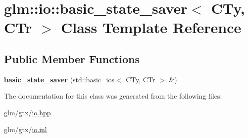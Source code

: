 \hypertarget{classglm_1_1io_1_1basic__state__saver}{\section{glm\-:\-:io\-:\-:basic\-\_\-state\-\_\-saver$<$ C\-Ty, C\-Tr $>$ Class Template Reference}
\label{classglm_1_1io_1_1basic__state__saver}
}
\subsection*{Public Member Functions}
\begin{DoxyCompactItemize}
\item 
\hypertarget{classglm_1_1io_1_1basic__state__saver_ab31652b0b7f2a24fa8f9fda2505de356}{{\bfseries basic\-\_\-state\-\_\-saver} (std\-::basic\-\_\-ios$<$ C\-Ty, C\-Tr $>$ \&)}\label{classglm_1_1io_1_1basic__state__saver_ab31652b0b7f2a24fa8f9fda2505de356}

\end{DoxyCompactItemize}


The documentation for this class was generated from the following files\-:\begin{DoxyCompactItemize}
\item 
glm/gtx/\hyperlink{io_8hpp}{io.\-hpp}\item 
glm/gtx/\hyperlink{io_8inl}{io.\-inl}\end{DoxyCompactItemize}
